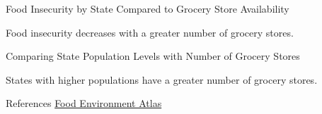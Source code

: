 \documentclass{beamer} %
\begin{document}
	\begin{frame}{Food Insecurity by State Compared to Grocery Store Availability} 
		
		Food insecurity decreases with a greater number of grocery stores. 
		
	\end{frame}

\begin{frame}{Comparing State Population Levels with Number of Grocery Stores} 
	
	States with higher populations have a greater number of grocery stores. 
	\end{frame}
	
	\begin{frame}{References} 
	\href{https://www.ers.usda.gov/data-products/food-environment-atlas/go-to-the-atlas/}{Food Environment Atlas }
\end{frame}
	
\end{document}
